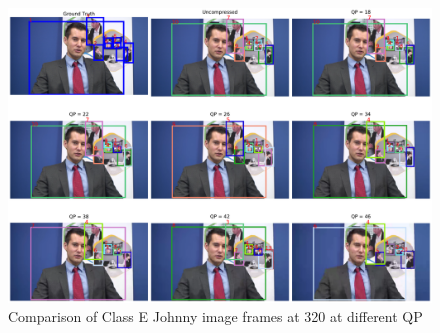 \begin{figure}[!htbp]
  \centering
  \includegraphics[width=1.0\linewidth]{img/Johnny_0_frame400.pdf}
  \caption[Comparison of Class E Johnny image frames at 320 at different QP]
  {
  Comparison of Class E Johnny image frames at 320 at different QP
  }
  \label{fig:Johnny_0_frame400}
\end{figure}